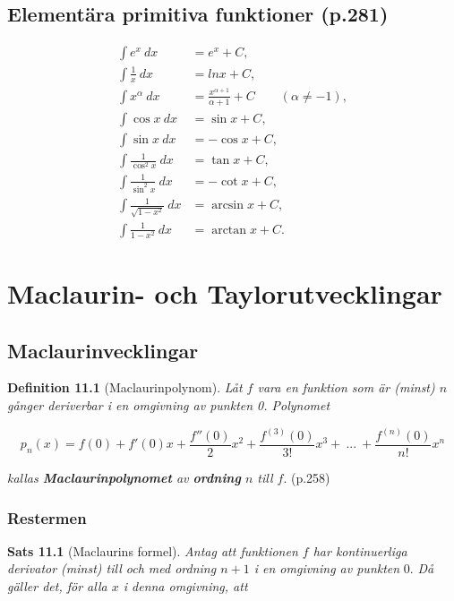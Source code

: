 \documentclass[11pt]{article}
\begin{document}
\subsection{Elementära primitiva funktioner (p.281)}

\begin{align}
    \int e^{x}\ dx &= e^x + C,\\
    \int \frac{1}{x}\ dx &= ln x + C,\\
    \int x^{\alpha}\ dx &= \frac{x^{\alpha + 1}}{\alpha + 1} + C \qquad (\alpha \neq -1),\\
    \int \cos x\ dx &= \sin x + C,\\
    \int \sin x\ dx &= -\cos x + C,\\
    \int \frac{1}{\cos^2 x}\ dx &= \tan x + C,\\
    \int \frac{1}{\sin^2 x}\ dx &= -\cot x + C,\\
    \int \frac{1}{\sqrt{1 - x^2}}\ dx &= \arcsin x + C,\\
    \int \frac{1}{1 - x^2}\ dx &= \arctan x + C.
\end{align}

\newpage
\section{Maclaurin- och Taylorutvecklingar}

\subsection{Maclaurinvecklingar}

\textbf{Definition 11.1} (Maclaurinpolynom). \textit{Låt $f$ vara en funktion som är (minst) $n$ gånger deriverbar i en omgivning av punkten 0. Polynomet}

\begin{equation}
    p_n(x) = f(0) + f'(0)x + \frac{f''(0)}{2}x^2 + \frac{f^{(3)}(0)}{3!}x^3 +\ ...\ + \frac{f^{(n)}(0)}{n!}x^n
    \label{eq:maclaurinpolynom}
\end{equation}

\textit{kallas \textbf{Maclaurinpolynomet} av \textbf{ordning} $n$ till $f$}. (p.258)

\subsubsection{Restermen}

\textbf{Sats 11.1} (Maclaurins formel). \textit{Antag att funktionen $f$ har kontinuerliga derivator (minst) till och med ordning $n + 1$ i en omgivning av punkten} 0. \textit{Då gäller det, för alla $x$ i denna omgivning, att}
\end{document}
